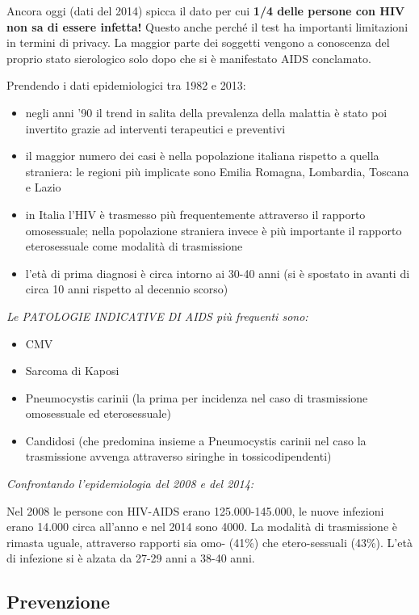Ancora oggi (dati del 2014) spicca il dato per cui \textbf{1/4 delle
persone con HIV non sa di essere infetta!} Questo anche perché il test
ha importanti limitazioni in termini di privacy. La maggior parte dei
soggetti vengono a conoscenza del proprio stato sierologico solo dopo
che si è manifestato AIDS conclamato.

Prendendo i dati epidemiologici tra 1982 e 2013:

\begin{itemize}
\item
  negli anni '90 il trend in salita della prevalenza della malattia è
  stato poi invertito grazie ad interventi terapeutici e preventivi
\item
  il maggior numero dei casi è nella popolazione italiana rispetto a
  quella straniera: le regioni più implicate sono Emilia Romagna,
  Lombardia, Toscana e Lazio
\item
  in Italia l'HIV è trasmesso più frequentemente attraverso il rapporto
  omosessuale; nella popolazione straniera invece è più importante il
  rapporto eterosessuale come modalità di trasmissione
\item
  l'età di prima diagnosi è circa intorno ai 30-40 anni (si è spostato
  in avanti di circa 10 anni rispetto al decennio scorso)
\end{itemize}

\emph{Le PATOLOGIE INDICATIVE DI AIDS più frequenti sono:}

\begin{itemize}
\item
  CMV
\item
  Sarcoma di Kaposi
\item
  Pneumocystis carinii (la prima per incidenza nel caso di trasmissione
  omosessuale ed eterosessuale)
\item
  Candidosi (che predomina insieme a Pneumocystis carinii nel caso la
  trasmissione avvenga attraverso siringhe in tossicodipendenti)
\end{itemize}

\emph{Confrontando l'epidemiologia del 2008 e del 2014:}

Nel 2008 le persone con HIV-AIDS erano 125.000-145.000, le nuove
infezioni erano 14.000 circa all'anno e nel 2014 sono 4000. La modalità
di trasmissione è rimasta uguale, attraverso rapporti sia omo- (41\%)
che etero-sessuali (43\%). L'età di infezione si è alzata da 27-29 anni
a 38-40 anni.

\subsection{Prevenzione}

